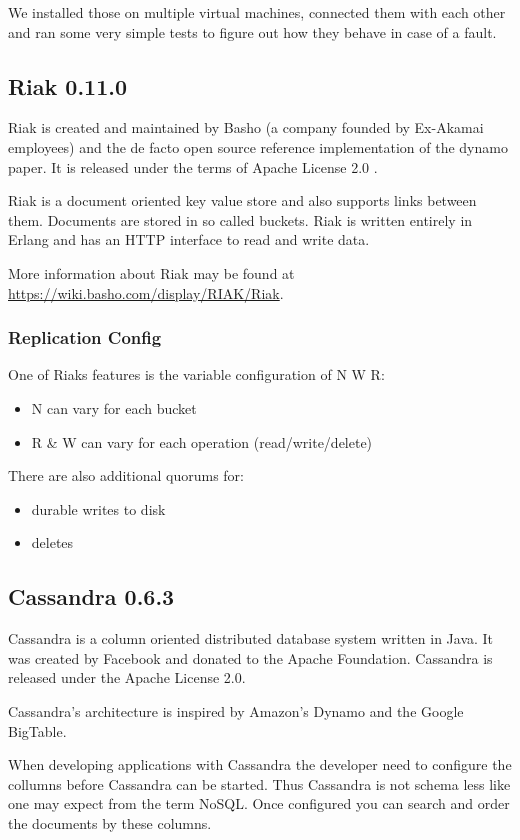 We installed those on multiple virtual machines, connected them
with each other and ran some very simple tests to figure out how
they behave in case of a fault.

\subsection{Riak 0.11.0}

Riak is created and maintained by Basho (a company founded by
Ex-Akamai employees) and the de facto open source reference
implementation of the dynamo paper. It is released under the terms
of Apache License 2.0 .

Riak is a document oriented key value store and also supports links
between them. Documents are stored in so called buckets. Riak is
written entirely in Erlang and has an HTTP interface to read and
write data.

More information about Riak may be found at
\url{https://wiki.basho.com/display/RIAK/Riak}.

\subsubsection{Replication Config}

One of Riaks features is the variable configuration of N W R:

\begin{itemize}
\item
  N can vary for each bucket
\item
  R \& W can vary for each operation (read/write/delete)
\end{itemize}
There are also additional quorums for:

\begin{itemize}
\item
  durable writes to disk
\item
  deletes
\end{itemize}
\subsection{Cassandra 0.6.3}

Cassandra is a column oriented distributed database system written
in Java. It was created by Facebook and donated to the Apache
Foundation. Cassandra is released under the Apache License 2.0.

Cassandra's architecture is inspired by Amazon's Dynamo and the
Google BigTable.

When developing applications with Cassandra the developer need to
configure the collumns before Cassandra can be started. Thus
Cassandra is not schema less like one may expect from the term
NoSQL. Once configured you can search and order the documents by
these columns.

